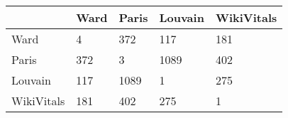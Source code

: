 \begin{tabular}{lllll}
\toprule
{} & Ward & Paris & Louvain & WikiVitals \\
\midrule
Ward       &    4 &   372 &     117 &        181 \\
Paris      &  372 &     3 &    1089 &        402 \\
Louvain    &  117 &  1089 &       1 &        275 \\
WikiVitals &  181 &   402 &     275 &          1 \\
\bottomrule
\end{tabular}
